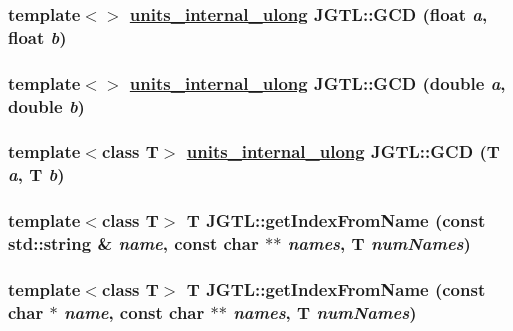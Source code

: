 \hypertarget{namespace_j_g_t_l_25c40254ef74d292898efc841fa19182}{
\subsubsection[GCD]{\setlength{\rightskip}{0pt plus 5cm}template$<$$>$ \hyperlink{namespace_j_g_t_l_1924d6fd42e2d9661bc0b5a5063b99b3}{units\_\-internal\_\-ulong} JGTL::GCD (float {\em a}, float {\em b})}}
\label{namespace_j_g_t_l_25c40254ef74d292898efc841fa19182}


\hypertarget{namespace_j_g_t_l_3288a482038d7cc9db66241879178908}{
\subsubsection[GCD]{\setlength{\rightskip}{0pt plus 5cm}template$<$$>$ \hyperlink{namespace_j_g_t_l_1924d6fd42e2d9661bc0b5a5063b99b3}{units\_\-internal\_\-ulong} JGTL::GCD (double {\em a}, double {\em b})}}
\label{namespace_j_g_t_l_3288a482038d7cc9db66241879178908}


\hypertarget{namespace_j_g_t_l_5d540b652d4a0d15e83ae5daa5695edd}{
\subsubsection[GCD]{\setlength{\rightskip}{0pt plus 5cm}template$<$class T$>$ \hyperlink{namespace_j_g_t_l_1924d6fd42e2d9661bc0b5a5063b99b3}{units\_\-internal\_\-ulong} JGTL::GCD (T {\em a}, T {\em b})}}
\label{namespace_j_g_t_l_5d540b652d4a0d15e83ae5daa5695edd}


\hypertarget{namespace_j_g_t_l_9cf5cbff66a1b2b4b4befb08e49f7531}{
\subsubsection[getIndexFromName]{\setlength{\rightskip}{0pt plus 5cm}template$<$class T$>$ T JGTL::get\-Index\-From\-Name (const std::string \& {\em name}, const char $\ast$$\ast$ {\em names}, T {\em num\-Names})}}
\label{namespace_j_g_t_l_9cf5cbff66a1b2b4b4befb08e49f7531}


\hypertarget{namespace_j_g_t_l_314e435c010086e0452f20d100df3816}{
\subsubsection[getIndexFromName]{\setlength{\rightskip}{0pt plus 5cm}template$<$class T$>$ T JGTL::get\-Index\-From\-Name (const char $\ast$ {\em name}, const char $\ast$$\ast$ {\em names}, T {\em num\-Names})}}
\label{namespace_j_g_t_l_314e435c010086e0452f20d100df3816}


